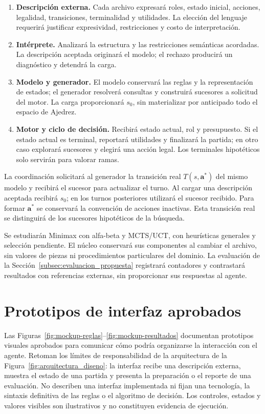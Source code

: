 \begin{enumerate}
    \item \textbf{Descripción externa.} Cada archivo expresará roles, estado inicial, acciones, legalidad, transiciones, terminalidad y utilidades. La elección del lenguaje requerirá justificar expresividad, restricciones y costo de interpretación.
    \item \textbf{Intérprete.} Analizará la estructura y las restricciones semánticas acordadas. La descripción aceptada originará el modelo; el rechazo producirá un diagnóstico y detendrá la carga.
    \item \textbf{Modelo y generador.} El modelo conservará las reglas y la representación de estados; el generador resolverá consultas y construirá sucesores a solicitud del motor. La carga proporcionará $s_0$, sin materializar por anticipado todo el espacio de Ajedrez.
    \item \textbf{Motor y ciclo de decisión.} Recibirá estado actual, rol y presupuesto. Si el estado actual es terminal, reportará utilidades y finalizará la partida; en otro caso explorará sucesores y elegirá una acción legal. Los terminales hipotéticos solo servirán para valorar ramas.
\end{enumerate}

La coordinación solicitará al generador la transición real $T(s,\mathbf a^*)$ del mismo modelo y recibirá el sucesor para actualizar el turno. Al cargar una descripción aceptada recibirá $s_0$; en los turnos posteriores utilizará el sucesor recibido. Para formar $\mathbf a^*$ se conservará la convención de acciones inactivas. Esta transición real se distinguirá de los sucesores hipotéticos de la búsqueda.

Se estudiarán Minimax con alfa-beta y MCTS/UCT, con heurísticas generales y selección pendiente. El núcleo conservará sus componentes al cambiar el archivo, sin valores de piezas ni procedimientos particulares del dominio. La evaluación de la Sección~\ref{subsec:evaluacion_propuesta} registrará contadores y contrastará resultados con referencias externas, sin proporcionar sus respuestas al agente.

\section{Prototipos de interfaz aprobados}
\label{sec:prototipos-interfaz}

Las Figuras~\ref{fig:mockup-reglas}--\ref{fig:mockup-resultados} documentan prototipos visuales aprobados para comunicar cómo podría organizarse la interacción con el agente. Retoman los límites de responsabilidad de la arquitectura de la Figura~\ref{fig:arquitectura_diseno}: la interfaz recibe una descripción externa, muestra el estado de una partida y presenta la preparación o el reporte de una evaluación. No describen una interfaz implementada ni fijan una tecnología, la sintaxis definitiva de las reglas o el algoritmo de decisión. Los controles, estados y valores visibles son ilustrativos y no constituyen evidencia de ejecución.


